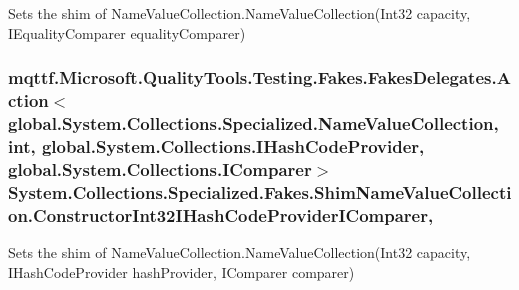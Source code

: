 Sets the shim of Name\-Value\-Collection.\-Name\-Value\-Collection(\-Int32 capacity, I\-Equality\-Comparer equality\-Comparer)

\hypertarget{class_system_1_1_collections_1_1_specialized_1_1_fakes_1_1_shim_name_value_collection_aebc78f559f7b56d5fca777bf07849ddd}{
\subsubsection[{Constructor\-Int32\-I\-Hash\-Code\-Provider\-I\-Comparer}]{\setlength{\rightskip}{0pt plus 5cm}mqttf.\-Microsoft.\-Quality\-Tools.\-Testing.\-Fakes.\-Fakes\-Delegates.\-Action$<$global.\-System.\-Collections.\-Specialized.\-Name\-Value\-Collection, int, global.\-System.\-Collections.\-I\-Hash\-Code\-Provider, global.\-System.\-Collections.\-I\-Comparer$>$ System.\-Collections.\-Specialized.\-Fakes.\-Shim\-Name\-Value\-Collection.\-Constructor\-Int32\-I\-Hash\-Code\-Provider\-I\-Comparer\hspace{0.3cm}{\ttfamily [static]}, {\ttfamily [set]}}}\label{class_system_1_1_collections_1_1_specialized_1_1_fakes_1_1_shim_name_value_collection_aebc78f559f7b56d5fca777bf07849ddd}


Sets the shim of Name\-Value\-Collection.\-Name\-Value\-Collection(\-Int32 capacity, I\-Hash\-Code\-Provider hash\-Provider, I\-Comparer comparer)

